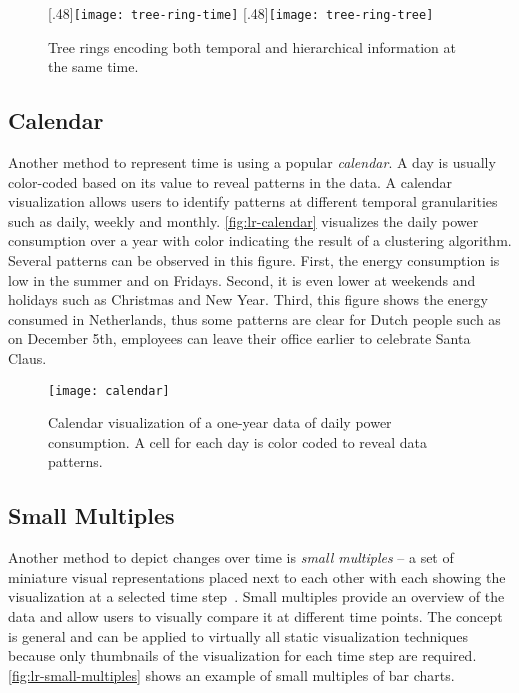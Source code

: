 \begin{figure}[!htb]
\centering
{}[.48\columnwidth]{\texttt{[image: tree-ring-time]}}
\hfill
{}[.48\columnwidth]{\texttt{[image: tree-ring-tree]}}
\caption{Tree rings encoding both temporal and hierarchical information at the same time. }
\end{figure}

\subsection{Calendar}
Another method to represent time is using a popular \emph{calendar}. A day is usually color-coded based on its value to reveal patterns in the data. A calendar visualization allows users to identify patterns at different temporal granularities such as daily, weekly and monthly.  \autoref{fig:lr-calendar} visualizes the daily power consumption over a year with color indicating the result of a clustering algorithm. Several patterns can be observed in this figure. First, the energy consumption is low in the summer and on Fridays. Second, it is even lower at weekends and holidays such as Christmas and New Year. Third, this figure shows the energy consumed in Netherlands, thus some patterns are clear for Dutch people such as on December 5th, employees can leave their office earlier to celebrate Santa Claus.

\begin{figure}[!htb]
	\centering
	\texttt{[image: calendar]}
	\caption{Calendar visualization of a one-year data of daily power consumption. A cell for each day is color coded to reveal data patterns. }
	\label{fig:lr-calendar}
\end{figure}

\subsection{Small Multiples}
Another method to depict changes over time is \emph{small multiples} -- a set of miniature visual representations placed next to each other with each showing the visualization at a selected time step~\cite{Tufte1983}. Small multiples provide an overview of the data and allow users to visually compare it at different time points. The concept is general and can be applied to virtually all static visualization techniques because only thumbnails of the visualization for each time step are required. \autoref{fig:lr-small-multiples} shows an example of small multiples of bar charts.

